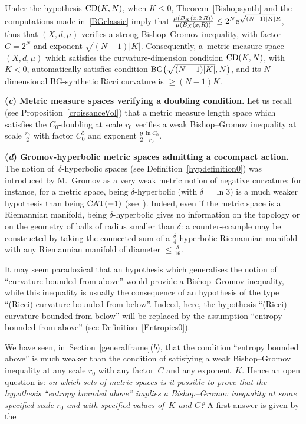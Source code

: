 \documentclass[pdftex]{sigma}
\numberwithin{equation}{section}
\begin{document}
Under the hypothesis ${\rm CD}(K, N)$, when $K\le 0$, Theorem~\ref{Bishopsynth} and the computations made in~\eqref{BGclassic} imply that
$\frac{\mu (B_X(x, 2\,R))}{\mu (B_X(x, R))} \le 2^N{\rm e}^{\sqrt{(N-1) |K|} R}$, thus that $(X,d,\mu)$ verifies a strong Bishop--Gromov inequality, with factor $C = 2^N$ and exponent $ \sqrt{(N-1) |K|}$. Consequently, a~metric measure space $(X,d,\mu)$ which satisfies the curvature-dimension condition
${\rm CD}(K, N)$, with \mbox{$K < 0$}, automatically satisfies condition ${\rm BG}\big(\sqrt{(N-1) |K|},N\big)$, and its $N$-dimensional BG-synthetic Ricci
curvature is $\ge (N-1) K$.

\medskip\noindent
{\bf (\emph{c}) Metric measure spaces verifying a doubling condition.}
Let us recall (see Proposition~\ref{croissanceVol}) that a metric measure
length space which satisfies the $C_0$-doubling at scale $r_0$ verifies
a weak Bishop--Gromov inequality at scale $\frac{r_0}{2}$ with factor $C_0^5$ and exponent $\frac{9}{2} \frac{ \ln C_0}{r_0}$.

\medskip\noindent
{\bf (\emph{d}) Gromov-hyperbolic metric spaces admitting a cocompact action.}
The notion of~$\delta$-hyperbolic spaces (see Definition~\ref{hypdefinition0}) was introduced by M.~Gromov as a very weak metric notion of negative
curvature: for instance, for a metric space, being $\delta$-hyperbolic (with $\delta = \ln 3$) is a much weaker hypothesis than being ${\rm CAT}(-1)$
(see~\cite[Proposition~1.4.3, p.~12]{CDP}).
Indeed, even if the metric
space is a Riemannian manifold, being $\delta$-hyperbolic gives no information on the topology or on the geometry of balls of radius smaller than $\delta$:
a counter-example may be constructed by taking the connected sum of a $\frac{\delta}{4}$-hyperbolic Riemannian manifold with any Riemannian manifold
of diameter $\le \frac{\delta}{16}$.

It may seem paradoxical that an hypothesis which generalises the notion of ``curvature bounded from above'' would provide a Bishop--Gromov inequality,
while this inequality is usually the consequence of an hypothesis of the type ``(Ricci) curvature bounded from below''. Indeed, here, the hypothesis
``(Ricci) curvature bounded from below'' will be replaced by the assumption ``entropy bounded from above'' (see Definition~\ref{Entropies0}).


We have seen, in~Section~\ref{generalframe}($b$), that the condition ``entropy bounded above'' is much weaker than the condition of satisfying a weak Bishop--Gromov inequality at any scale $r_0$ with any factor~$C$ and any exponent~$K$.
Hence an open question is: {\em on which sets of metric spaces is it possible to prove that the
hypothesis ``entropy bounded above'' implies a Bishop--Gromov inequality at some specified scale $r_0$ and with specified values of~$K$ and $C$?}
A first answer is given by the
\end{document}
